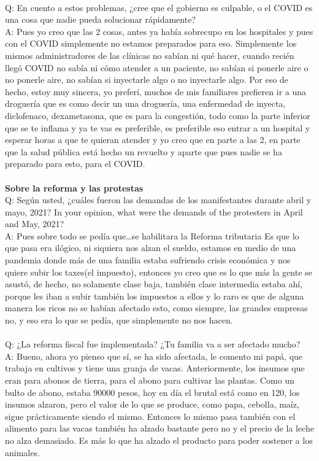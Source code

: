 \documentclass{phyasgn}\usepackage{nag}
\begin{document}
\\
Q: En cuento a estos problemas, ¿cree que el gobierno es culpable, o el COVID es una cosa que nadie pueda solucionar rápidamente?\\
A: Pues yo creo que las 2 cosas, antes ya había sobrecupo en los hospitales y pues con el COVID simplemente no estamos preparados para eso. Simplemente los mismos administradores de las clínicas no sabían ni qué hacer, cuando recién llegó COVID no sabía ni cómo atender a un paciente, no sabían si ponerle aire o no ponerle aire, no sabían si inyectarle algo o no inyectarle algo. Por eso de hecho, estoy muy sincera, yo preferí, muchos de mis familiares prefieren ir a una droguería que es como decir un una droguería, una enfermedad de inyecta, diclofenaco, dexametasona, que es para la congestión, todo como la parte inferior que se te inflama y ya te vas es preferible, es preferible eso entrar a un hospital y esperar horas a que te quieran atender y yo creo que en parte a las 2, en parte que la salud pública está hecho un revuelto y aparte que pues nadie se ha preparado para esto, para el COVID.\\
\\
\textbf{Sobre la reforma y las protestas}\\
Q: Según usted, ¿cuáles fueron las demandas de los manifestantes durante abril y mayo, 2021? In your opinion, what were the demands of the protesters in April and May, 2021?\\
A: Pues sobre todo se pedía que…se habilitara la Reforma tributaria
Es que lo que pasa era ilógico, ni siquiera nos alzan el sueldo, estamos en medio de una pandemia donde más de una familia estaba sufriendo crisis económica y nos quiere subir los taxes(el impuesto), entonces yo creo que es lo que más la gente se asustó, de hecho, no solamente clase baja, también clase intermedia estaba ahí, porque les iban a subir también los impuestos a ellos y lo raro es que de alguna manera los ricos no se habían afectado esto, como siempre, las grandes empresas no, y eso era lo que se pedía, que simplemente no nos hacen.\\
\\
Q: ¿La reforma fiscal fue implementada? ¿Tu familia va a ser afectado mucho?\\
A: Bueno, ahora yo pienso que sí, se ha sido afectada, le comento mi papá, que trabaja en cultivos y tiene una granja de vacas. Anteriormente, los insumos que eran para abonos de tierra, para el abono para cultivar las plantas. Como un bulto de abono, estaba 90000 pesos, hoy en día el brutal está como en 120, los insumos alzaron, pero el valor de lo que se produce, como papa, cebolla, maíz, sigue prácticamente siendo el mismo. Entonces lo mismo pasa también con el alimento para las vacas también ha alzado bastante pero no y el precio de la leche no alza demasiado. Es más lo que ha alzado el producto para poder sostener a los animales.\\
\end{document}
